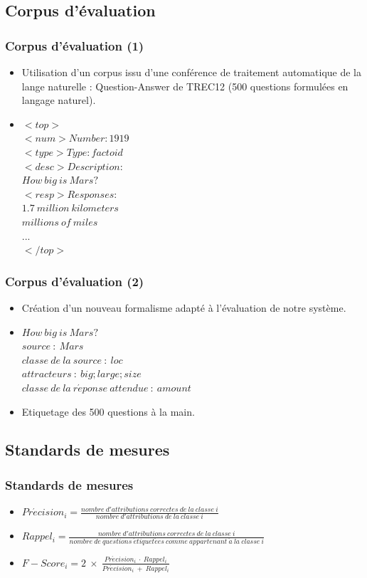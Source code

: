 \documentclass[xcolor=dvipsnames]{beamer}
\begin{document}
\subsection{Corpus d'évaluation}
\frame
{
  \frametitle{Corpus d'évaluation (1)}
  \begin{itemize}
    \item<1-> Utilisation d'un corpus issu d'une conférence de traitement automatique de la lange naturelle : Question-Answer de TREC12 (500 questions formulées en langage naturel).
    \item<2-> $<top>$\\
$<num> Number: 1919$\\
$<type> Type: factoid$\\
$<desc> Description:$\\
$How \: big \: is \: Mars?$\\
$<resp> Responses:$\\
$1.7 \: million \: kilometers$\\
$millions \: of \: miles$\\
$...$\\
$</top>$
  \end{itemize}
}
\frame
{
  \frametitle{Corpus d'évaluation (2)}
  \begin{itemize}
    \item<1-> Création d'un nouveau formalisme adapté à l'évaluation de notre système.
    \item<2-> $How \: big \: is \: Mars?$\\
    $source \: : \: Mars$\\
    $classe \: de \: la \: source \: : \: loc$\\
    $attracteurs \: : \: big;large;size$\\
    $classe \: de \: la \: r\acute{e}ponse \: attendue \: : \: amount$
    \item<3-> Etiquetage des 500 questions \og{}à la main\fg{}. 
  \end{itemize}
}
\subsection{Standards de mesures}
\frame
{
  \frametitle{Standards de mesures}
  \begin{itemize}
    \item<1-> $Pr\acute{e}cision_i = \frac{nombre \: d'attributions \: correctes \: de \: la \: classe \: i}{nombre \: d'attributions \: de \: la \: classe \: i}$
    \item<2-> $Rappel_i = \frac{nombre \: d'attributions \: correctes \: de \: la \: classe \: i}{nombre \: de \: questions \: \acute{e}tiquet\acute{e}es \: comme \: appartenant \: \grave{a} \: la \: classe \: i}$
    \item<3-> $F-Score_i = 2 \: \times \: \frac{Pr\acute{e}cision_i \: \cdot \: Rappel_i}{Pr\acute{e}cision_i \: + \: Rappel_i}$
  \end{itemize}
}
\end{document}
